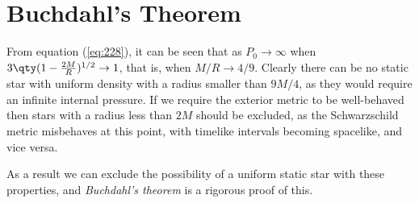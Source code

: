 \section{Buchdahl's Theorem}
\label{sec:buchdahls-theorem}

From equation (\ref{eq:228}), it can be seen that as $P_0 \to \infty$
when $3 \qty(1- \frac{2M}{R})^{1/2} \to 1$, that is, when $M/R \to
4/9$. Clearly there can be no static star with uniform density with a
radius smaller than $9M/4$, as they would require an infinite internal
pressure. If we require the exterior metric to be well-behaved then
stars with a radius less than $2M$ should be excluded, as the
Schwarzschild metric misbehaves at this point, with timelike intervals
becoming spacelike, and vice versa.

As a result we can exclude the possibility of a uniform static star
with these properties, and \emph{Buchdahl's theorem} is a rigorous
proof of this.



